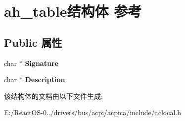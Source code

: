 \hypertarget{structah__table}{}\section{ah\+\_\+table结构体 参考}
\label{structah__table}
\subsection*{Public 属性}
\begin{DoxyCompactItemize}
\item 
\mbox{\label{structah__table_a8ea183a326375f3da9b66050dd3552dc}} 
char $\ast$ {\bfseries Signature}
\item 
\mbox{\label{structah__table_a5f190b640a0abe32f6969e9dd5f9803f}} 
char $\ast$ {\bfseries Description}
\end{DoxyCompactItemize}


该结构体的文档由以下文件生成\+:\begin{DoxyCompactItemize}
\item 
E\+:/\+React\+O\+S-\/0../drivers/bus/acpi/acpica/include/aclocal.\+h\end{DoxyCompactItemize}
